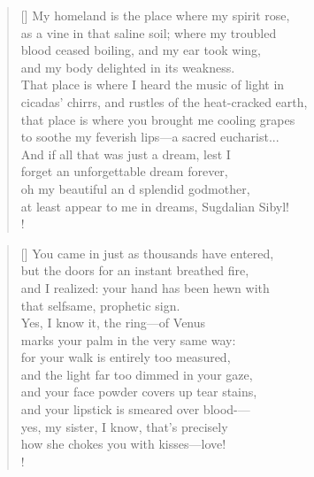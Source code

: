\documentclass[]{article}
\begin{document}
\settowidth{\versewidth}{My homeland is the place where my spirit rose }
\begin{verse}[\versewidth]
My homeland is the place where my spirit rose,\\
as a vine in that saline soil; where my troubled\\
blood ceased boiling, and my ear took wing,\\
and my body delighted in its weakness.\\
That place is where I heard the music of light in\\
cicadas' chirrs, and rustles of the heat-cracked earth,\\
that place is where you brought me cooling grapes\\
to soothe my feverish lips—a sacred eucharist...\\
And if all that was just a dream, lest I\\
forget an unforgettable dream forever,\\
oh my beautiful an d splendid godmother,\\
at least appear to me in dreams, Sugdalian Sibyl!\\!
\end{verse}
\newpage 

\settowidth{\versewidth}{You came in just as thousands have entered,  }
\begin{verse}[\versewidth]
You came in just as thousands have entered,\\
but the doors for an instant breathed fire,\\
and I realized: your hand has been hewn with\\
that selfsame, prophetic sign.\\
Yes, I know it, the ring—of Venus\\
marks your palm in the very same way:\\
for your walk is entirely too measured,\\
and the light far too dimmed in your gaze,\\
and your face powder covers up tear stains,\\
and your lipstick is smeared over blood-— \\
yes, my sister, I know, that's precisely\\
how she chokes you with kisses—love!\\!
\end{verse}
\bigskip \bigskip
\end{document}
